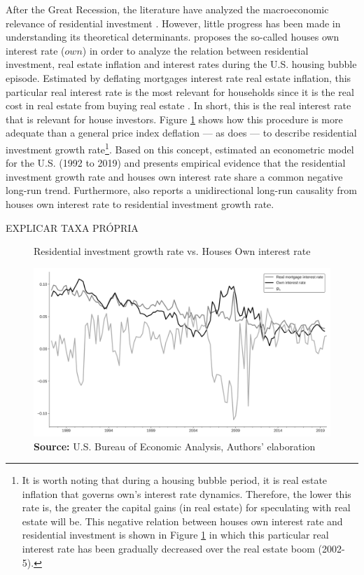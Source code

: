 \documentclass[11pt]{article}
\begin{document}
After the Great Recession, the literature have analyzed the macroeconomic relevance of residential investment \cites{leamer_housing_2015}{fiebiger_semi-autonomous_2018}.
However, little progress has been made in understanding its theoretical determinants.
\textcite{teixeira_crescimento_2015} proposes the so-called houses own interest rate (\(own\)) in order to analyze the relation between residential investment, real estate inflation and interest rates during the U.S. housing bubble episode.
Estimated by deflating mortgages interest rate real estate inflation, this particular real interest rate is the most relevant for households since it is the real cost in real estate from buying real estate  \cite[p.~53]{teixeira_crescimento_2015}.
In short, this is the real interest rate that is relevant for house investors.
Figure \ref{propria_investo} shows how this  procedure is more adequate than a general price index deflation --- as \textcite[p.~143--6]{fair_macroeconometric_2013} does --- to describe residential investment growth rate\footnote{It is worth noting that during a housing bubble period, it is real estate inflation that governs own's interest rate dynamics. Therefore, the lower this rate is, the greater the capital gains (in real estate) for speculating with real estate will be. This negative relation between houses own interest rate and residential investment is shown in Figure \ref{propria_investo} in which this particular real interest rate has been gradually decreased over the real estate boom (2002-5).}.
Based on this concept, \textcite{petrini_demanda_2019} estimated an econometric model for the U.S. (1992 to 2019) and presents empirical evidence that the residential investment growth rate and houses own interest rate share a common negative long-run trend.
Furthermore, \textcite{petrini_demanda_2019} also reports a unidirectional long-run causality from houses own interest rate to residential investment growth rate.

EXPLICAR TAXA PRÓPRIA


\begin{figure}[htb]
	\centering
	\caption{Residential investment growth rate vs. Houses Own interest rate}
	\label{propria_investo}
	\includegraphics[width=.8\textwidth]{./figs/Own_gI}
	\caption*{\textbf{Source:} U.S. Bureau of Economic Analysis, Authors' elaboration}
\end{figure}
\end{document}
